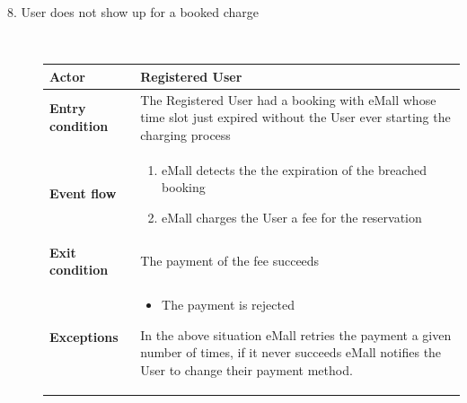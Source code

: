 \documentclass[11pt]{article}
\begin{document}
\begin{description}
    \item [8. User does not show up for a booked charge] \hfill \\
    \begin{table}[H]
        \centering
        \setlength{\tabcolsep}{18pt}
        \renewcommand{\arraystretch}{1.4}
        \begin{tabularx}{\textwidth}{|>{\hsize=0.5\hsize}X|>{\hsize=1.5\hsize}X|}
            \hline
            \textbf{Actor} & Registered User \\
            \hline
            \textbf{Entry condition} & The Registered User had a booking with eMall whose time slot just expired without the User ever starting the charging process \\
            \hline
            \textbf{Event flow} & 
                \begin{minipage}[t]{\hsize}
                \begin{enumerate}[topsep=0pt, leftmargin=*]
                    \item eMall detects the the expiration of the breached booking
                    \item eMall charges the User a fee for the reservation
                \end{enumerate}
                \end{minipage}
                \vspace{6pt}
            \\
            \hline
            \textbf{Exit condition} & The payment of the fee succeeds \\
            \hline
            \textbf{Exceptions} & 
                \begin{minipage}[t]{\hsize}
                \vspace{0pt}
                \begin{itemize}[topsep=0pt, leftmargin=*]
                    \item The payment is rejected
                \end{itemize}
                \vspace{8pt}
                \end{minipage}
                In the above situation eMall retries the payment a given number of times, if it never succeeds eMall notifies the User to change their payment method.
                \vspace{6pt}
            \\
            \hline
        \end{tabularx}
    \end{table}
    

\end{description}
\end{document}

